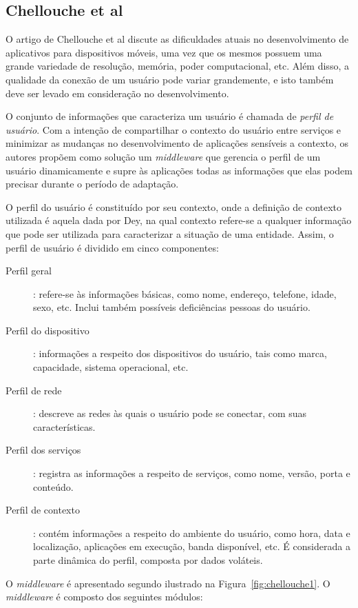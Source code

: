 \documentclass[a4paper]{article}
\begin{document}
\subsection{Chellouche et al}

O artigo de Chellouche et al\cite{chellouche10} discute as dificuldades atuais no desenvolvimento de aplicativos para dispositivos móveis, uma vez que os mesmos possuem uma grande variedade de resolução, memória, poder computacional, etc. Além disso, a qualidade da conexão de um usuário pode variar grandemente, e isto também deve ser levado em consideração no desenvolvimento.

O conjunto de informações que caracteriza um usuário é chamada de \emph{perfil de usuário}. Com a intenção de compartilhar o contexto do usuário entre serviços e minimizar as mudanças no desenvolvimento de aplicações sensíveis a contexto, os autores propõem como solução um \emph{middleware} que gerencia o perfil de um usuário dinamicamente e supre às aplicações todas as informações que elas podem precisar durante o período de adaptação.

O perfil do usuário é constituído por seu contexto, onde a definição de contexto utilizada é aquela dada por Dey\cite{dey2001}, na qual contexto refere-se a qualquer informação que pode ser utilizada para caracterizar a situação de uma entidade. Assim, o perfil de usuário é dividido em cinco componentes:

\begin{description}
  \item[Perfil geral]: refere-se às informações básicas, como nome, endereço, telefone, idade, sexo, etc. Inclui também possíveis deficiências pessoas do usuário.
  \item[Perfil do dispositivo]: informações a respeito dos dispositivos do usuário, tais como marca, capacidade, sistema operacional, etc.
  \item[Perfil de rede]: descreve as redes às quais o usuário pode se conectar, com suas características.
  \item[Perfil dos serviços]: registra as informações a respeito de serviços, como nome, versão, porta e conteúdo.
  \item[Perfil de contexto]: contém informações a respeito do ambiente do usuário, como hora, data e localização, aplicações em execução, banda disponível, etc. É considerada a parte dinâmica do perfil, composta por dados voláteis.
\end{description}

O \emph{middleware} é apresentado segundo ilustrado na Figura~\ref{fig:chellouche1}. O \emph{middleware} é composto dos seguintes módulos:
\end{document}

